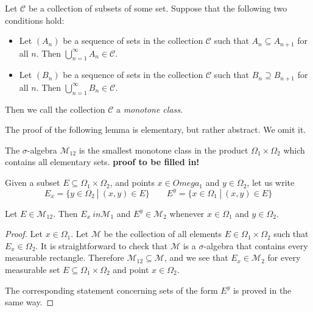 \begin{definition}
Let $\mathcal C$ be a collection of subsets of some set.  Suppose that the following two conditions hold:

\begin{itemize}

\item Let $(A_n)$ be a sequence of sets in the collection $\mathcal C$ such that $A_n\subseteq A_{n+1}$ for all $n$.  Then $\bigcup_{n=1}^\infty A_n \in {\mathcal C}$.

\item Let $(B_n)$ be a sequence of sets in the collection $\mathcal C$ such that $B_n\supseteq B_{n+1}$ for all $n$.  Then $\bigcup_{n=1}^\infty B_n \in {\mathcal C}$.

\end{itemize}

Then we call the collection $\mathcal C$ a {\em monotone class}.
\end{definition}

The proof of the following lemma is elementary, but rather abstract.  We omit it.

\begin{lemma} \label{tech-product}
The $\sigma$-algebra ${\mathcal M}_{12}$ is the smallest monotone class in the product $\Omega_1 \times \Omega_2$ which contains all elementary sets.
\textbf{proof to be filled in!}
\end{lemma}

Given a subset $E\subseteq \Omega_1 \times \Omega_2$, and points $x\in Omega_1$ and $y\in \Omega_2$, let us write
$$E_x = \{ y\in \Omega_2 \ |\ (x,y)\in E \} \qquad E^y = \{ x\in \Omega_1 \ |\ (x,y)\in E \}$$

\begin{proposition}
Let $E\in {\mathcal M}_{12}$.  Then $E_x\ in {\mathcal M}_1$ and $E^y\in {\mathcal M}_2$ whenever $x\in \Omega_1$ and $y\in \Omega_2$.
\end{proposition}

\begin{proof}
Let $x\in \Omega_1$.  Let $\mathcal M$ be the collection of all elements $E\in \Omega_1 \times \Omega_2$ such that $E_x\in \Omega_2$.  It is straightforward to check that $\mathcal M$ is a $\sigma$-algebra that contains every measurable rectangle.  Therefore ${\mathcal M}_{12}\subseteq {\mathcal M}$, and we see that $E_x\in {\mathcal M}_2$ for every measurable set $E\subseteq \Omega_1\times \Omega_2$ and point $x\in \Omega_2$.

The corresponding statement concerning sets of the form $E^y$ is proved in the same way.
\end{proof}

